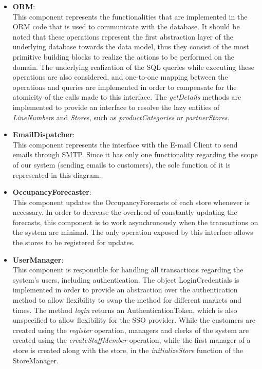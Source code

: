 \begin{itemize}
    \item \textbf{ORM}: \\
    This component represents the functionalities that are implemented in the ORM code that is used to communicate with the database.
    It should be noted that these operations represent the first abstraction layer of the underlying database towards the data model, thus they consist of the most primitive building blocks to realize the actions to be performed on the domain.
    The underlying realization of the SQL queries while executing these operations are also considered, and one-to-one mapping between the operations and queries are implemented in order to compensate for the atomicity of the calls made to this interface.
    The \textit{getDetails} methods are implemented to provide an interface to resolve the lazy entities of \textit{LineNumber}s and \textit{Store}s, such as \textit{productCategories} or \textit{partnerStores}.
    \item \textbf{EmailDispatcher}: \\
    This component represents the interface with the E-mail Client to send emails through SMTP.
    Since it has only one functionality regarding the scope of our system (sending emails to customers), the sole function of it is represented in this diagram.
    \item \textbf{OccupancyForecaster}: \\
    This component updates the OccupancyForecasts of each store whenever is necessary.
    In order to decrease the overhead of constantly updating the forecasts, this component is to work asynchronously when the transactions on the system are minimal.
    The only operation exposed by this interface allows the stores to be registered for updates.
    \item \textbf{UserManager}: \\
    This component is responsible for handling all transactions regarding the system's users, including authentication.
    The object LoginCredentials is implemented in order to provide an abstraction over the authentication method to allow flexibility to swap the method for different markets and times.
    The method \textit{login} returns an AuthenticationToken, which is also unspecified to allow flexibility for the SSO provider.
    While the customers are created using the \textit{register} operation, managers and clerks of the system are created using the \textit{createStaffMember} operation, while the first manager of a store is created along with the store, in the \textit{initializeStore} function of the StoreManager.

\end{itemize}
